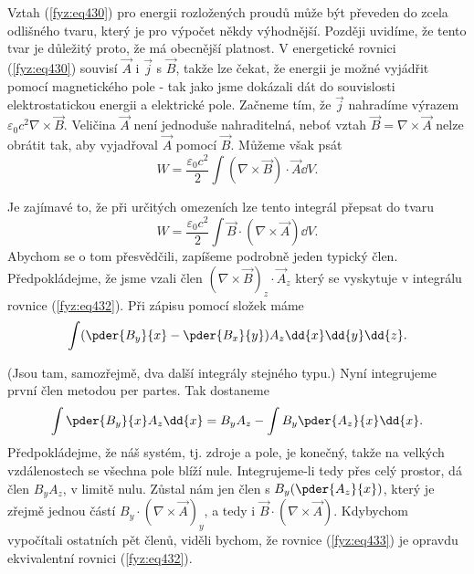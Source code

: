   Vztah (\ref{fyz:eq430}) pro energii rozložených proudů může být převeden do zcela odlišného 
  tvaru, který je pro výpočet někdy výhodnější. Později uvidíme, že tento tvar je důležitý proto, 
  že má obecnější platnost. V energetické rovnici (\ref{fyz:eq430}) souvisí \(\vec{A}\) i 
  \(\vec{j}\) s \(\vec{B}\), takže lze čekat, že energii je možné vyjádřit pomocí magnetického pole 
  - tak jako jsme dokázali dát do souvislosti elektrostatickou energii a elektrické pole. Začneme 
  tím, že \(\vec{j}\) nahradíme výrazem \(\varepsilon_0c^2\nabla\times\vec{B}\). Veličina 
  \(\vec{A}\) není jednoduše nahraditelná, neboť vztah \(\vec{B}=\nabla\times\vec{A}\) nelze 
  obrátit tak, aby vyjadřoval \(\vec{A}\) pomocí \(\vec{B}\). Můžeme však psát
  \begin{equation}\label{fyz:eq432}
    W = \frac{\varepsilon_0c^2}{2}\int(\nabla\times\vec{B})\cdot\vec{A}\dd{V}.
  \end{equation}
  
  Je zajímavé to, že při určitých omezeních lze tento integrál přepsat do tvaru
  \begin{equation}\label{fyz:eq433}
    W = \frac{\varepsilon_0c^2}{2}\int\vec{B}\cdot(\nabla\times\vec{A})\dd{V}.
  \end{equation}
  Abychom se o tom přesvědčili, zapíšeme podrobně jeden typický člen. Předpokládejme, že jsme vzali 
  člen \((\nabla\times\vec{B})_z\cdot\vec{A}_z\) který se vyskytuje v integrálu rovnice 
  (\ref{fyz:eq432}). Při zápisu pomocí složek máme
  \begin{equation*}
    \int(\pder{B_y}{x} - \pder{B_x}{y})A_z\dd{x}\dd{y}\dd{z}.
  \end{equation*}
  
  (Jsou tam, samozřejmě, dva další integrály stejného typu.) Nyní integrujeme první člen metodou 
  per partes. Tak dostaneme
  \begin{equation*}
    \int\pder{B_y}{x}A_z\dd{x} = B_yA_z - \int B_y\pder{A_z}{x}\dd{x}.
  \end{equation*}
  Předpokládejme, že náš systém, tj. zdroje a pole, je konečný, takže na velkých vzdálenostech se 
  všechna pole blíží nule. Integrujeme-li tedy přes celý prostor, dá člen \(B_yA_z\), v limitě 
  nulu. Zůstal nám jen člen s \(B_y(\pder{A_z}{x})\), který je zřejmě jednou částí 
  \(B_y\cdot(\nabla\times\vec{A})_y\), a tedy i \(\vec{B}\cdot(\nabla\times\vec{A})\). Kdybychom 
  vypočítali ostatních pět členů, viděli bychom, že rovnice (\ref{fyz:eq433}) je opravdu 
  ekvivalentní rovnici (\ref{fyz:eq432}). 
  
